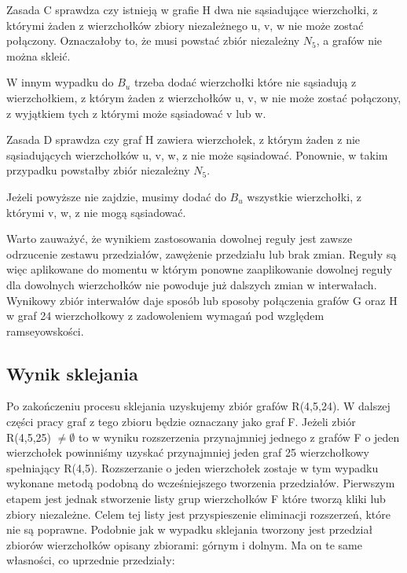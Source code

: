 \documentclass[11pt]{article}
\begin{document}
Zasada C sprawdza czy istnieją w grafie H dwa nie sąsiadujące wierzchołki, z którymi żaden z wierzchołków zbiory niezależnego u, v, w nie może zostać połączony. 
Oznaczałoby to, że musi powstać zbiór niezależny $N_5$, a grafów nie można skleić.


W innym wypadku do $B_u$ trzeba dodać wierzchołki które nie sąsiadują z wierzchołkiem, 
z którym żaden z wierzchołków u, v, w nie może zostać połączony, z wyjątkiem tych z którymi może sąsiadować v lub w.  \linebreak

Zasada D sprawdza czy graf H zawiera wierzchołek, z którym żaden z nie sąsiadujących wierzchołków u, v, w, z
nie może sąsiadować. Ponownie, w takim przypadku powstałby zbiór niezależny $N_5$.

Jeżeli powyższe nie zajdzie, musimy dodać do $B_u$ wszystkie wierzchołki, z którymi v, w, z nie mogą sąsiadować. \linebreak


Warto zauważyć, że wynikiem zastosowania dowolnej reguły jest zawsze odrzucenie zestawu przedziałów, zawężenie przedziału lub brak zmian. Reguły są więc aplikowane do momentu w którym ponowne zaaplikowanie dowolnej reguły dla dowolnych wierzchołków nie powoduje już dalszych zmian w interwałach. Wynikowy zbiór interwałów daje sposób lub sposoby połączenia grafów G oraz H w graf 24 wierzchołkowy z zadowoleniem wymagań pod względem ramseyowskości.

\subsection{Wynik sklejania}

Po zakończeniu procesu sklejania uzyskujemy zbiór grafów R(4,5,24). W dalszej części pracy graf z tego zbioru będzie oznaczany jako graf F. Jeżeli zbiór R(4,5,25) $\neq \emptyset$ to w wyniku rozszerzenia przynajmniej jednego z grafów F o jeden wierzchołek powinniśmy uzyskać przynajmniej jeden graf 25 wierzchołkowy spełniający R(4,5). 
Rozszerzanie o jeden wierzchołek zostaje w tym wypadku wykonane metodą podobną do wcześniejszego tworzenia przedziałów. Pierwszym etapem jest jednak stworzenie listy grup wierzchołków F które tworzą kliki lub zbiory niezależne. Celem tej listy jest przyspieszenie eliminacji rozszerzeń, które nie są poprawne.
Podobnie jak w wypadku sklejania tworzony jest przedział zbiorów wierzchołków opisany zbiorami: górnym i dolnym. Ma on te same własności, co uprzednie przedziały:
\end{document}

